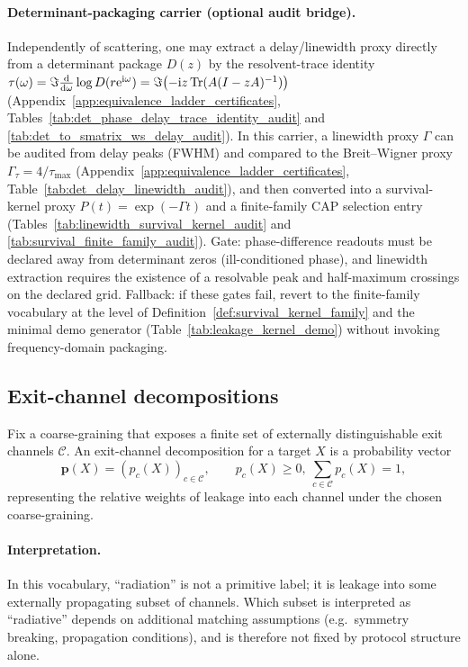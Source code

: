 \paragraph{Determinant-packaging carrier (optional audit bridge).}
\AuditTag Independently of scattering, one may extract a delay/linewidth proxy directly from a determinant package $D(z)$ by the resolvent-trace identity
$\tau(\omega)=\Im\frac{\mathrm{d}}{\mathrm{d}\omega}\log D(r\mathrm{e}^{\mathrm{i}\omega})=\Im\bigl(-\mathrm{i} z\,\mathrm{Tr}(A(I-zA)^{-1})\bigr)$ (Appendix~\ref{app:equivalence_ladder_certificates},
Tables~\ref{tab:det_phase_delay_trace_identity_audit} and \ref{tab:det_to_smatrix_ws_delay_audit}).
In this carrier, a linewidth proxy $\Gamma$ can be audited from delay peaks (FWHM) and compared to the Breit--Wigner proxy $\Gamma_\tau=4/\tau_{\max}$
(Appendix~\ref{app:equivalence_ladder_certificates}, Table~\ref{tab:det_delay_linewidth_audit}),
and then converted into a survival-kernel proxy $P(t)=\exp(-\Gamma t)$ and a finite-family CAP selection entry
(Tables~\ref{tab:linewidth_survival_kernel_audit} and \ref{tab:survival_finite_family_audit}).
\AuditTag Gate: phase-difference readouts must be declared away from determinant zeros (ill-conditioned phase), and linewidth extraction requires the existence of a resolvable peak and half-maximum crossings on the declared grid.
\AuditTag Fallback: if these gates fail, revert to the finite-family vocabulary at the level of Definition~\ref{def:survival_kernel_family}
and the minimal demo generator (Table~\ref{tab:leakage_kernel_demo}) without invoking frequency-domain packaging.

\subsection{Exit-channel decompositions}
\label{subsec:exit_channel_decomposition}

\begin{definition}
\label{def:exit_channels_protocol}
Fix a coarse-graining that exposes a finite set of externally distinguishable exit channels $\mathcal C$.
An exit-channel decomposition for a target $X$ is a probability vector
\[
\mathbf p(X)=(p_c(X))_{c\in\mathcal C},\qquad p_c(X)\ge 0,\ \sum_{c\in\mathcal C}p_c(X)=1,
\]
representing the relative weights of leakage into each channel under the chosen coarse-graining.
\end{definition}

\paragraph{Interpretation.}
\AuditTag In this vocabulary, ``radiation'' is not a primitive label; it is leakage into some externally propagating subset of channels.
Which subset is interpreted as ``radiative'' depends on additional matching assumptions (e.g.\ symmetry breaking, propagation conditions), and is therefore not fixed by protocol structure alone.

